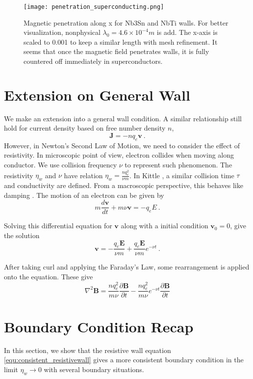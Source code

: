 \begin{figure}[H]
	\centering
	\texttt{[image: penetration\_superconducting.png]}
	\caption[Bx Distribution]{Magnetic penetration along x for Nb3Sn and NbTi walls. For better visualization, nonphysical $\lambda_{0}=4.6\times10^{-4}m$ is add. The x-axis is scaled to 0.001 to keep a similar length with mesh refinement. It seems that once the magnetic field penetrates walls, it is fully countered off immediately in superconductors.}
	\label{fig:PenetrationCurveSuperconducting}
\end{figure}

\section{Extension on General Wall}
We make an extension into a general wall condition. A similar relationship still hold for current density based on free number density $n$,  
$$
\mathbf{J}=-n q_e \mathbf{v}\ .
$$
However, in Newton's Second Law of Motion, we need to consider the effect of resistivity. In microscopic point of view, electron collides when moving along conductor. We use collision frequency $\nu$ to represent such phenomenon. The resistivity $\eta_w$ and $\nu$ have relation $\eta_w=\frac{nq_e^2}{\nu m}$. In Kittle \cite{kittel2018introduction}, a similar collision time $\tau$ and conductivity are defined. From a macroscopic perspective, this behaves like damping \cite{kittel2018introduction}. The motion of an electron can be given by 
$$
m\frac{d\mathbf{v}}{dt}+m\nu \mathbf{v}=-q_eE\ .
$$

Solving this differential equation for $\mathbf{v}$ along with a initial condition $\mathbf{v}_0=0$, give the solution 
$$
\mathbf{v}=-\frac{q_e\mathbf{E}}{\nu m}+\frac{q_e\mathbf{E}}{\nu m}e^{-\nu t}\ .
$$

After taking curl and applying the Faraday's Law, some rearrangement is applied onto the equation. These give 
\begin{equation}
	\nabla^2\mathbf{B}=\frac{nq_e^2}{m\nu}\frac{\partial \mathbf{B}}{\partial t}-\frac{nq_e^2}{m\nu}e^{-\nu t}\frac{\partial \mathbf{B}}{\partial t}
	\label{equ:consistent_resistivewall}
\end{equation}

\section{Boundary Condition Recap} 
In this section, we show that the resistive wall equation \ref{equ:consistent_resistivewall} gives a more consistent boundary condition in the limit $\eta_{w}\to0$ with several boundary situations.
